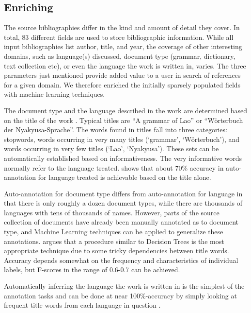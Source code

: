 \documentclass[10pt, a4paper]{article}
\begin{document}
\subsection{Enriching}
The source bibliographies differ in the kind and amount of detail they cover. In total, 83 different fields are used to store bibliographic information.  While all input bibliographies list author, title, and year, the coverage of other interesting domains, such as language(s) discussed, document type (grammar, dictionary, text collection etc), or even the language the work is written in, varies. The three parameters just mentioned provide added value to a user in search of references for a given domain. We therefore enriched the initially sparsely populated fields with machine learning techniques.

The document type and the language described in the work are determined based on the title of the work \cite{Hammarstroem2009,cl:Hammarstrom:CLEF2011}. Typical titles are ``A grammar of Lao'' or ``W\"orterbuch der Nyakyusa-Sprache''. The words found in titles fall into three categories: stopwords, words occurring in very many titles (`grammar', `W\"orterbuch'), and words occurring in very few titles (`Lao', `Nyakyusa'). These sets can be automatically established based on informativeness. The very informative words normally refer to the language treated. \cite{Hammarstroem2008} shows that about 70\% accuracy in auto-annotation for language treated is achievable based on the title alone.

Auto-annotation for document type differs from auto-annotation for
language in that there is only roughly a dozen  document types, while
there are thousands of languages with tens of thousands of
names. However, parts of the source collection of documents have
already been manually annotated as to document type, and Machine Learning
techniques can be applied to generalize these annotations. \cite{cl:Hammarstrom:CLEF2011} argues that a procedure similar to Decision Trees is the most
appropriate technique due to some tricky dependencies between title
words. Accuracy depends somewhat on the frequency and characteristics of
individual labels, but F-scores in the range of 0.6-0.7 can be achieved.

Automatically inferring the language the work is written in is the simplest
of the annotation tasks and can be done at near 100\%-accuracy by simply
looking at frequent title words from each language in question
\cite{cl:Hammarstrom:CLEF2011}.

\end{document}
